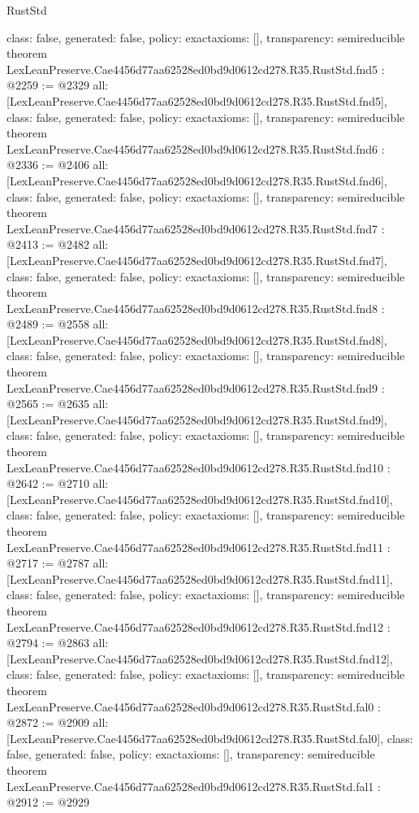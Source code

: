 \begin{lexlean}{RustStd}
\begin{coremodule}
{  class: false,
  generated: false,
  policy: exact{axioms: []},
  transparency: semireducible
}
theorem LexLeanPreserve.Cae4456d77aa62528ed0bd9d0612cd278.R35.RustStd.fnd5 : @2259 := @2329 {
  all: [LexLeanPreserve.Cae4456d77aa62528ed0bd9d0612cd278.R35.RustStd.fnd5],
  class: false,
  generated: false,
  policy: exact{axioms: []},
  transparency: semireducible
}
theorem LexLeanPreserve.Cae4456d77aa62528ed0bd9d0612cd278.R35.RustStd.fnd6 : @2336 := @2406 {
  all: [LexLeanPreserve.Cae4456d77aa62528ed0bd9d0612cd278.R35.RustStd.fnd6],
  class: false,
  generated: false,
  policy: exact{axioms: []},
  transparency: semireducible
}
theorem LexLeanPreserve.Cae4456d77aa62528ed0bd9d0612cd278.R35.RustStd.fnd7 : @2413 := @2482 {
  all: [LexLeanPreserve.Cae4456d77aa62528ed0bd9d0612cd278.R35.RustStd.fnd7],
  class: false,
  generated: false,
  policy: exact{axioms: []},
  transparency: semireducible
}
theorem LexLeanPreserve.Cae4456d77aa62528ed0bd9d0612cd278.R35.RustStd.fnd8 : @2489 := @2558 {
  all: [LexLeanPreserve.Cae4456d77aa62528ed0bd9d0612cd278.R35.RustStd.fnd8],
  class: false,
  generated: false,
  policy: exact{axioms: []},
  transparency: semireducible
}
theorem LexLeanPreserve.Cae4456d77aa62528ed0bd9d0612cd278.R35.RustStd.fnd9 : @2565 := @2635 {
  all: [LexLeanPreserve.Cae4456d77aa62528ed0bd9d0612cd278.R35.RustStd.fnd9],
  class: false,
  generated: false,
  policy: exact{axioms: []},
  transparency: semireducible
}
theorem LexLeanPreserve.Cae4456d77aa62528ed0bd9d0612cd278.R35.RustStd.fnd10 : @2642 := @2710 {
  all: [LexLeanPreserve.Cae4456d77aa62528ed0bd9d0612cd278.R35.RustStd.fnd10],
  class: false,
  generated: false,
  policy: exact{axioms: []},
  transparency: semireducible
}
theorem LexLeanPreserve.Cae4456d77aa62528ed0bd9d0612cd278.R35.RustStd.fnd11 : @2717 := @2787 {
  all: [LexLeanPreserve.Cae4456d77aa62528ed0bd9d0612cd278.R35.RustStd.fnd11],
  class: false,
  generated: false,
  policy: exact{axioms: []},
  transparency: semireducible
}
theorem LexLeanPreserve.Cae4456d77aa62528ed0bd9d0612cd278.R35.RustStd.fnd12 : @2794 := @2863 {
  all: [LexLeanPreserve.Cae4456d77aa62528ed0bd9d0612cd278.R35.RustStd.fnd12],
  class: false,
  generated: false,
  policy: exact{axioms: []},
  transparency: semireducible
}
theorem LexLeanPreserve.Cae4456d77aa62528ed0bd9d0612cd278.R35.RustStd.fal0 : @2872 := @2909 {
  all: [LexLeanPreserve.Cae4456d77aa62528ed0bd9d0612cd278.R35.RustStd.fal0],
  class: false,
  generated: false,
  policy: exact{axioms: []},
  transparency: semireducible
}
theorem LexLeanPreserve.Cae4456d77aa62528ed0bd9d0612cd278.R35.RustStd.fal1 : @2912 := @2929 {
}
\end{coremodule}
\end{lexlean}
